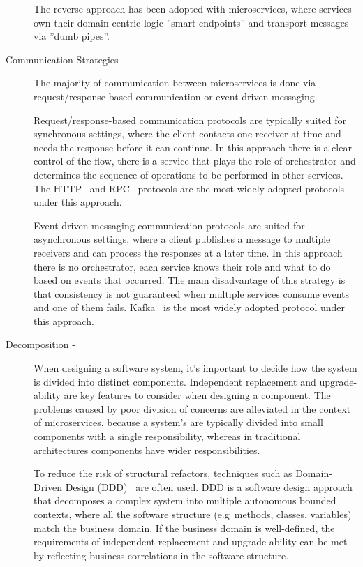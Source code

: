 \begin{description}
    The reverse approach has been adopted with microservices,
    where services own their domain-centric logic ''smart endpoints'' and transport messages via ''dumb pipes''.
    \item[Communication Strategies -] The majority of communication between microservices is done via request/response-based communication or event-driven messaging.

    Request/response-based communication protocols are typically suited for synchronous settings,
    where the client contacts one receiver at time and needs the response before it can continue.
    In this approach there is a clear control of the flow,
    there is a service that plays the role of orchestrator and determines the sequence of operations to be performed in other services.
    The HTTP~\cite{http} and RPC~\cite{rpc} protocols are the most widely adopted protocols under this approach.

    Event-driven messaging communication protocols are suited for asynchronous settings,
    where a client publishes a message to multiple receivers and can process the responses at a later time.
    In this approach there is no orchestrator, each service knows their role and what to do based on events that occurred.
    The main disadvantage of this strategy is that consistency is not guaranteed when multiple services consume events and one of them fails.
    Kafka~\cite{kafka} is the most widely adopted protocol under this approach.
    \item[Decomposition -] When designing a software system, it's important to decide how the system is divided into distinct components.
    Independent replacement and upgrade-ability are key features to consider when designing a component.
    The problems caused by poor division of concerns are alleviated in the context of microservices, because a system's are typically divided into small components with a single responsibility,
    whereas in traditional architectures components have wider responsibilities.

    To reduce the risk of structural refactors, techniques such as Domain-Driven Design (DDD)~\cite{ddd} are often used.
    DDD is a software design approach that decomposes a complex system into multiple autonomous bounded contexts,
    where all the software structure (e.g\ methods, classes, variables) match the business domain.
    If the business domain is well-defined, the requirements of independent replacement and upgrade-ability can be met by reflecting business correlations in the software structure.
\end{description}

